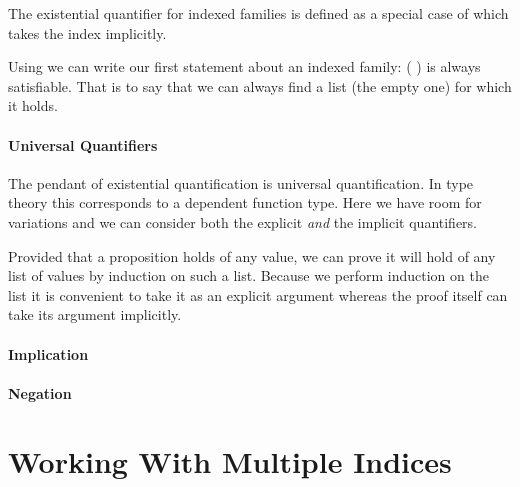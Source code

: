 
The existential quantifier for indexed families is defined as a special
case of  which takes the index  implicitly.


Using  we can write our first statement about an indexed family:
{( )} is always satisfiable. That is to say that we can always
find a list (the empty one) for which it holds.


\paragraph{Universal Quantifiers} The pendant of existential quantification
is universal quantification. In type theory this corresponds to a dependent
function type. Here we have room for variations and we can consider both
the explicit \emph{and} the implicit quantifiers.


Provided that a proposition holds of any value, we can prove it will hold
of any list of values by induction on such a list. Because we perform
induction on the list it is convenient to take it as an explicit argument
whereas the proof itself can take its argument implicitly.


\paragraph{Implication}

\paragraph{Negation}


\section{Working With Multiple Indices}

